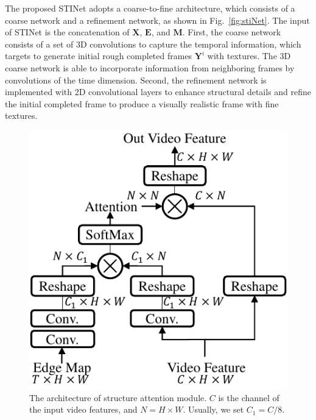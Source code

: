 



The proposed STINet adopts a coarse-to-fine architecture, which consists of a coarse network and a refinement network, as shown in Fig.~\ref{fig:stiNet}.
%
The input of STINet is the concatenation of $\boldsymbol{X}$, $\boldsymbol{E}$, and $\boldsymbol{M}$.
First, the coarse network consists of a set of 3D convolutions to capture the temporal information, which targets to generate initial rough completed frames $\boldsymbol{Y}^i$ with textures. 
The 3D coarse network is able to incorporate information from neighboring frames by convolutions of the time dimension.
Second, the refinement network is implemented with 2D convolutional layers to enhance structural details and refine the initial completed frame to produce a visually realistic frame with fine textures.

\begin{figure}[t]
	\centering
	\includegraphics[width=0.7\columnwidth]{SEM} %
	\caption{The architecture of structure attention module. $C$ is the channel of the input video features, and $N=H\times W$. Usually, we set $C_1=C/8$.}
	\label{SEM}
\end{figure}

